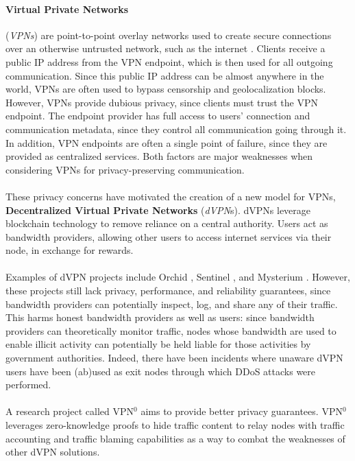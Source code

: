 \paragraph{Virtual Private Networks}(\textit{VPNs}) are point-to-point
overlay networks used to create secure connections over an otherwise
untrusted network, such as the internet \cite{venkateswaran_2001}. Clients receive a public IP address from the VPN endpoint, which is then used
for all outgoing communication. Since this public IP address can be almost anywhere in the world, VPNs are often
used to bypass censorship \cite{hobbs_roberts_2018} and geolocalization blocks. However, VPNs provide dubious privacy, since clients must trust the VPN
endpoint. The endpoint provider has full access to users' connection and
communication metadata, since they control all communication going through it. In addition, VPN
endpoints are often a single point of failure, since they are provided as
centralized services. Both factors are major weaknesses when
considering VPNs for privacy-preserving communication.
\\~\\These privacy concerns have motivated the creation of a new model for VPNs,
\textbf{Decentralized Virtual Private Networks} (\textit{dVPN}s). dVPNs leverage blockchain technology to remove reliance on a central authority. Users act as bandwidth providers, allowing other users to access internet services via their node, in exchange for rewards. 
\\~\\Examples of dVPN projects include Orchid \cite{orchid}, Sentinel \cite{sentinel}, and Mysterium \cite{mysterium}. However, these projects still lack privacy, performance, and reliability guarantees, since bandwidth providers can potentially inspect, log, and share any of their traffic. This harms honest bandwidth providers as well as users: since bandwidth providers can theoretically monitor traffic, nodes whose bandwidth are used to enable illicit activity can potentially be held liable for those activities by government authorities. Indeed, there have been incidents where unaware dVPN users have been (ab)used as exit nodes through which DDoS attacks
were performed. 
\\~\\A research project called VPN$^0$ \cite{vpn0} aims to provide better privacy guarantees. VPN$^0$ leverages zero-knowledge proofs to hide traffic content to relay nodes with traffic accounting and traffic blaming capabilities as a way to combat the weaknesses of other dVPN solutions.

